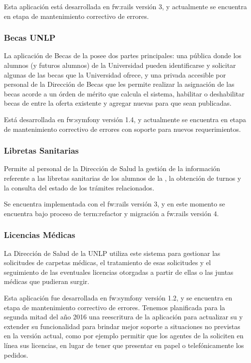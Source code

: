 Esta aplicación está desarrollada en \gls{fw:rails} versión 3, y actualmente se encuentra en etapa de mantenimiento correctivo de errores.


\subsubsection{Becas UNLP}
\label{anexo:detalle-clientes:becas}

La aplicación de Becas de la {\unlp} posee dos partes principales: una pública donde los alumnos (y futuros alumnos) de la Universidad pueden identificarse y solicitar algunas de las becas que la Universidad ofrece, y una privada accesible por personal de la Dirección de Becas que les permite realizar la asignación de las becas acorde a un órden de mérito que calcula el sistema, habilitar o deshabilitar becas de entre la oferta existente y agregar nuevas para que sean publicadas.

Está desarrollada en \gls{fw:symfony} versión 1.4, y actualmente se encuentra en etapa de mantenimiento correctivo de errores con soporte para nuevos requerimientos.


\subsubsection{Libretas Sanitarias}
\label{anexo:detalle-clientes:libretas}

Permite al personal de la Dirección de Salud la gestión de la información referente a las libretas sanitarias de los alumnos de la {\unlp}, la obtención de turnos y la consulta del estado de los trámites relacionados.

Se encuentra implementada con el  \gls{fw:rails} versión 3, y en este momento se encuentra bajo proceso de \gls{term:refactor} y migración a \gls{fw:rails} versión 4.


\subsubsection{Licencias Médicas}
\label{anexo:detalle-clientes:licencias}

La Dirección de Salud de la UNLP utiliza este sistema para gestionar las solicitudes de carpetas médicas, el tratamiento de esas solicitudes y el seguimiento de las eventuales licencias otorgadas a partir de ellas o las juntas médicas que pudieran surgir.

Esta aplicación fue desarrollada en \gls{fw:symfony} versión 1.2, y se encuentra en etapa de mantenimiento correctivo de errores. Tenemos planificada para la segunda mitad del año 2016 una reescritura de la aplicación para actualizar su  y extender su funcionalidad para brindar mejor soporte a situaciones no previstas en la versión actual, como por ejemplo permitir que los agentes de la {\unlp} soliciten en línea sus licencias, en lugar de tener que presentar en papel o telefónicamente los pedidos.


